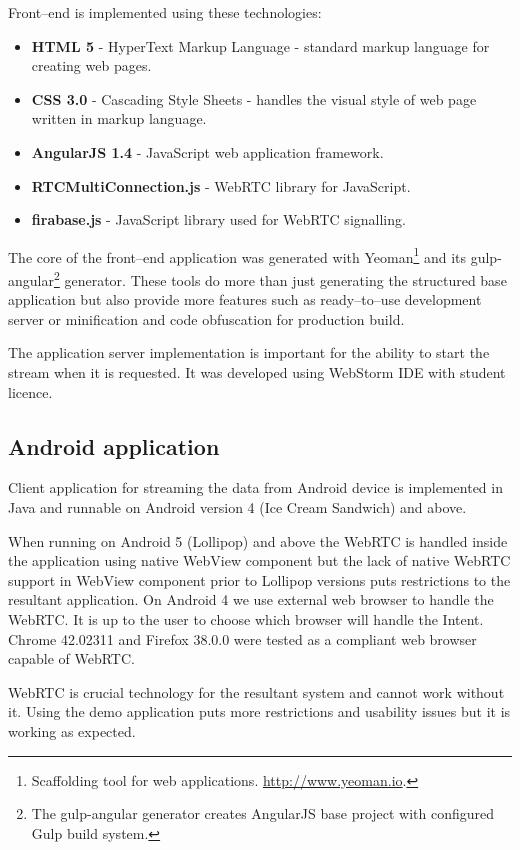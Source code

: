 \noindent
Front--end is implemented using these technologies:
\begin{itemize}
	\item \textbf{HTML 5} - HyperText Markup Language - standard markup language for creating web pages.
	\item \textbf{CSS 3.0} - Cascading Style Sheets - handles the visual style of web page written in markup language.
	\item \textbf{AngularJS 1.4} - JavaScript web application framework.
	\item \textbf{RTCMultiConnection.js} - WebRTC library for JavaScript.
	\item \textbf{firabase.js} - JavaScript library used for WebRTC signalling.
\end{itemize}


The core of the front--end application was generated with Yeoman\footnote{Scaffolding tool for web applications. \url{http://www.yeoman.io}.} and its gulp-angular\footnote{The gulp-angular generator creates AngularJS base project with configured Gulp build system.} generator. These tools do more than just generating the structured base application but also provide more features such as ready--to--use development server or minification and code obfuscation for production build.

The application server implementation is important for the ability to start the stream when it is requested. It was developed using WebStorm IDE with student licence.




\subsection{Android application}
Client application for streaming the data from Android device is implemented in Java and runnable on Android version 4 (Ice Cream Sandwich) and above.

When running on Android 5 (Lollipop) and above the WebRTC is handled inside the application using native WebView component but the lack of native WebRTC support in WebView component prior to Lollipop versions puts restrictions to the resultant application. On Android 4 we use external web browser to handle the WebRTC. It is up to the user to choose which browser will handle the Intent. Chrome 42.02311 and Firefox 38.0.0 were tested as a compliant web browser capable of WebRTC.

WebRTC is crucial technology for the resultant system and cannot work without it. Using the demo application puts more restrictions and usability issues but it is working as expected.\\

